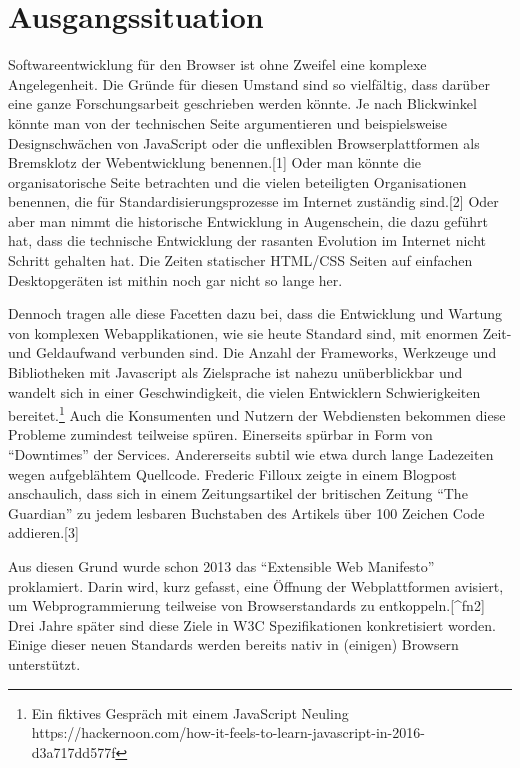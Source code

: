 \section{Ausgangssituation}\label{ausgangssituation}

Softwareentwicklung für den Browser ist ohne Zweifel eine komplexe
Angelegenheit. Die Gründe für diesen Umstand sind so vielfältig, dass
darüber eine ganze Forschungsarbeit geschrieben werden könnte. Je nach
Blickwinkel könnte man von der technischen Seite argumentieren und
beispielsweise Designschwächen von JavaScript oder die unflexiblen
Browserplattformen als Bremsklotz der Webentwicklung benennen.{[}1{]}
Oder man könnte die organisatorische Seite betrachten und die vielen
beteiligten Organisationen benennen, die für Standardisierungsprozesse
im Internet zuständig sind.{[}2{]} Oder aber man nimmt die historische
Entwicklung in Augenschein, die dazu geführt hat, dass die technische
Entwicklung der rasanten Evolution im Internet nicht Schritt gehalten
hat. Die Zeiten statischer HTML/CSS Seiten auf einfachen Desktopgeräten
ist mithin noch gar nicht so lange her.

Dennoch tragen alle diese Facetten dazu bei, dass die Entwicklung und
Wartung von komplexen Webapplikationen, wie sie heute Standard sind, mit
enormen Zeit- und Geldaufwand verbunden sind. Die Anzahl der Frameworks,
Werkzeuge und Bibliotheken mit Javascript als Zielsprache ist nahezu
unüberblickbar und wandelt sich in einer Geschwindigkeit, die vielen
Entwicklern Schwierigkeiten bereitet.\footnote{Ein fiktives Gespräch mit
  einem JavaScript Neuling
  https://hackernoon.com/how-it-feels-to-learn-javascript-in-2016-d3a717dd577f}
Auch die Konsumenten und Nutzern der Webdiensten bekommen diese Probleme
zumindest teilweise spüren. Einerseits spürbar in Form von ``Downtimes''
der Services. Andererseits subtil wie etwa durch lange Ladezeiten wegen
aufgeblähtem Quellcode. Frederic Filloux zeigte in einem Blogpost
anschaulich, dass sich in einem Zeitungsartikel der britischen Zeitung
``The Guardian'' zu jedem lesbaren Buchstaben des Artikels über 100
Zeichen Code addieren.{[}3{]}

Aus diesen Grund wurde schon 2013 das ``Extensible Web Manifesto''
proklamiert. Darin wird, kurz gefasst, eine Öffnung der Webplattformen
avisiert, um Webprogrammierung teilweise von Browserstandards zu
entkoppeln.{[}\^{}fn2{]} Drei Jahre später sind diese Ziele in W3C
Spezifikationen konkretisiert worden. Einige dieser neuen Standards
werden bereits nativ in (einigen) Browsern unterstützt.

